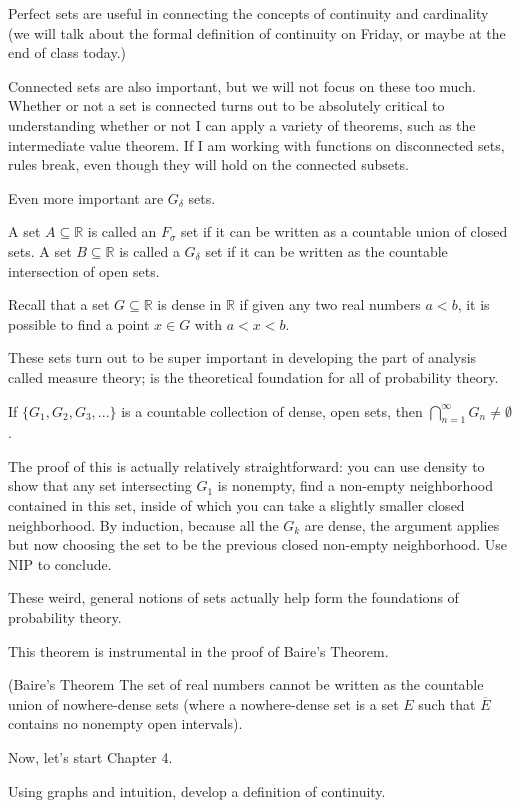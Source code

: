 \documentclass{ximera}
\begin{document}
Perfect sets are useful in connecting the concepts of continuity and cardinality (we will talk about the formal definition of continuity on Friday, or maybe at the end of class today.)

Connected sets are also important, but we will not focus on these too much.  Whether or not a set is connected turns out to be absolutely critical to understanding whether or not I can apply a variety of theorems, such as the intermediate value theorem.  If I am working with functions on disconnected sets, rules break, even though they will hold on the connected subsets.  %

Even more important are $G_\delta$ sets.

\begin{definition}
    A set $A \subseteq \mathbb{R}$ is called an $F_\sigma$ set if it can be written as a countable union of closed sets.  A set $B \subseteq \mathbb{R}$ is called a $G_\delta$ set if it can be written as the countable intersection of open sets.
\end{definition}

Recall that a set $G \subseteq \mathbb{R}$ is dense in $\mathbb{R}$ if given any two real numbers $a < b$, it is possible to find a point $x \in G$ with $a < x< b$.

These sets turn out to be super important in developing the part of analysis called measure theory;  is the theoretical foundation for all of probability theory.

\begin{theorem}
    If $\{G_1, G_2, G_3,...\}$ is a countable collection of dense, open sets, then $\bigcap\limits_{n=1}^\infty G_n \neq \emptyset$.
\end{theorem}
The proof of this is actually relatively straightforward: you can use density to show that any set intersecting $G_1$ is nonempty, find a non-empty neighborhood contained in this set, inside of which you can take a slightly smaller closed neighborhood.  By induction, because all the $G_k$ are dense, the argument applies but now choosing the set to be the previous closed non-empty neighborhood.  Use NIP to conclude.


These weird, general notions of sets actually help form the foundations of probability theory. %

This theorem is instrumental in the proof of Baire's Theorem.

\begin{theorem}{(Baire's Theorem}
    The set of real numbers cannot be written as the countable union of nowhere-dense sets (where a nowhere-dense set is a set $E$ such that $\overline{E}$ contains no nonempty open intervals).
\end{theorem}

Now, let's start Chapter 4.

\begin{exercise}
    Using graphs and intuition, develop a definition of continuity.
\end{exercise}
\end{document}
